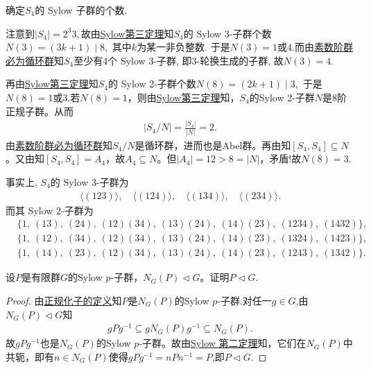 \documentclass[../../main.tex]{subfiles}%
\begin{document}
\begin{example}\label{example:S4的Sylow子群}
确定$S_4$的 Sylow 子群的个数.
\end{example}
\begin{solution}
注意到$|S_4| = 2^3 3,$故由\hyperref[theorem:Sylow第三定理]{Sylow第三定理}知$S_4$的 Sylow 3-子群个数$N(3) = (3k + 1) \mid 8,$ 其中$k$为某一非负整数. 于是$N(3)=1$或$4$.而由\hyperref[proposition:素数阶群必为循环群]{素数阶群必为循环群}知$S_4$至少有4个 Sylow 3-子群, 即3-轮换生成的子群, 故$N(3) = 4.$ 

再由\hyperref[theorem:Sylow第三定理]{Sylow第三定理}知$S_4$的 Sylow 2-子群个数$N(8) = (2k + 1) \mid 3,$ 于是$N(8)=1$或$3$.若$N(8)=1$，则由\hyperref[theorem:Sylow第三定理]{Sylow第三定理}知，$S_4$的Sylow 2-子群$N$是8阶正规子群。从而\begin{align*}
|S_4/N|=\frac{|S_4|}{|N|}=2.
\end{align*}
由\hyperref[proposition:素数阶群必为循环群]{素数阶群必为循环群}知$S_4/N$是循环群，进而也是Abel群。再由知$[S_4,S_4]\subseteq N$。又由知$[S_4,S_4]=A_4$，故$A_4\subseteq N$。但$|A_4|=12>8=|N|$，矛盾!故$N(8) = 3.$

事实上, $S_4$的 Sylow 3-子群为
\begin{align*}
\langle (123) \rangle, \quad \langle (124) \rangle, \quad \langle (134) \rangle, \quad \langle (234) \rangle.
\end{align*}
而其 Sylow 2-子群为
\begin{align*}
& \{1,\ (13),\ (24),\ (12)(34),\ (13)(24),\ (14)(23),\ (1234),\ (1432)\}, \\
& \{1,\ (12),\ (34),\ (12)(34),\ (13)(24),\ (14)(23),\ (1324),\ (1423)\}, \\
& \{1,\ (14),\ (23),\ (12)(34),\ (13)(24),\ (14)(23),\ (1243),\ (1342)\}.
\end{align*}

\end{solution}

\begin{example}
设$P$是有限群$G$的Sylow $p$-子群，$N_G(P)\lhd G$。证明$P\lhd G$.
\end{example}
\begin{proof}
由\hyperref[theorem:共轭子群和正规化子]{正规化子的定义}知$P$是$N_G(P)$的Sylow $p$-子群.对任一$g\in G$,由$N_G(P)\lhd G$知
\begin{align*}
gPg^{-1}\subseteq gN_G(P)g^{-1}\subseteq N_G(P).
\end{align*}
故$gPg^{-1}$也是$N_G(P)$的Sylow $p$-子群。故由\hyperref[theorem:Sylow 第二定理]{Sylow 第二定理}知，它们在$N_G(P)$中共轭，即有$n\in N_G(P)$使得$gPg^{-1}=nPn^{-1}=P$,即$P\lhd G$.
\end{proof}
\end{document}

